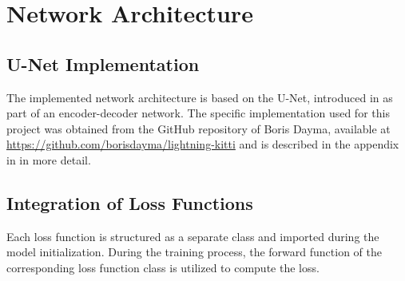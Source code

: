 \section{Network Architecture}
\label{sec:network_architecture}
\subsection{U-Net Implementation}
\label{subsec:unet_implementation}
The implemented network architecture is based on the U-Net, introduced in  as part of an encoder-decoder network. The specific implementation used for this project was obtained from the GitHub repository of Boris Dayma, available at \href{https://github.com/borisdayma/lightning-kitti}{https://github.com/borisdayma/lightning-kitti} and is described in the appendix in  in more detail. 

\subsection{Integration of Loss Functions}
\label{subsec:integration_loss_functions}
Each loss function is structured as a separate class and imported during the model initialization. During the training process, the forward function of the corresponding loss function class is utilized to compute the loss.

